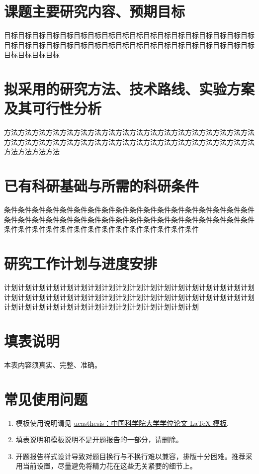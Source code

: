 \section{课题主要研究内容、预期目标}

目标目标目标目标目标目标目标目标目标目标目标目标目标目标目标目标目标目标目标目标目标目标目标目标目标目标目标目标目标目标目标目标目标目标目标目标目标目标目标目标

\section{拟采用的研究方法、技术路线、实验方案及其可行性分析}

方法方法方法方法方法方法方法方法方法方法方法方法方法方法方法方法方法方法方法方法方法方法方法方法方法方法方法方法方法方法方法方法方法方法方法方法方法方法方法方法

\section{已有科研基础与所需的科研条件}

条件条件条件条件条件条件条件条件条件条件条件条件条件条件条件条件条件条件条件条件条件条件条件条件条件条件条件条件条件条件条件条件条件条件条件条件条件条件条件条件条件条件条件条件条件条件条件条件条件条件

\section{研究工作计划与进度安排}

计划计划计划计划计划计划计划计划计划计划计划计划计划计划计划计划计划计划计划计划计划计划计划计划计划计划计划计划计划计划计划计划计划计划计划计划计划计划计划计划计划计划计划计划计划计划计划计划计划计划

\section*{填表说明}

本表内容须真实、完整、准确。

\section*{常见使用问题}

\begin{enumerate}
    \item 模板使用说明请见 \href{https://github.com/mohuangrui/ucasthesis}{ucasthesis：中国科学院大学学位论文 LaTeX 模板}.
    \item 填表说明和模板说明不是开题报告的一部分，请删除。
    \item 开题报告样式设计导致对题目换行与不换行难以兼容，排版十分困难。推荐采用当前设置，尽量避免将精力花在这些无关紧要的细节上。
\end{enumerate}

\nocite{*}%
